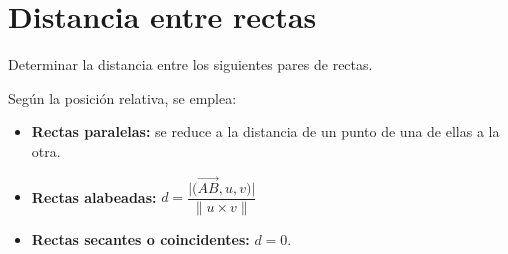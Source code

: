 \documentclass[12pt]{article}
\begin{document}
\section{Distancia entre rectas}

Determinar la distancia entre los siguientes pares de rectas.

Según la posición relativa, se emplea:

\begin{itemize}
    \item \textbf{Rectas paralelas:} se reduce a la distancia de un punto de
    una de ellas a la otra.
    \item \textbf{Rectas alabeadas:} $d=\dfrac{\big|\big(\overrightarrow{AB},u,v\big)\big|}{\|u\times v\|}$
    \item \textbf{Rectas secantes o coincidentes:} $d=0$.
\end{itemize}
\end{document}
